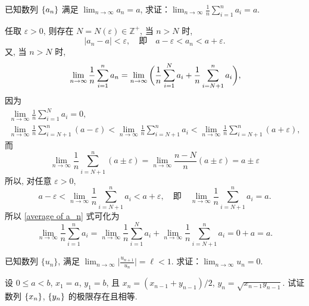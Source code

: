 \begin{exercise}
    已知数列 $\set{a_n}$ 满足 $\displaystyle \lim_{n \to \infty}a_n=a$, 求证：$\displaystyle \lim_{n \to \infty} \frac 1n \sum_{i=1}^{n}a_i=a$.
\end{exercise}

\begin{proofs}
    任取 $\varepsilon>0$, 则存在 $N=N(\varepsilon) \in \mathbb{Z}^+$, 当 $n>N$ 时, 
    \[ \lvert a_n-a \rvert  < \varepsilon,\quad\text{即}\quad a-\varepsilon<a_n<a+\varepsilon. \]
    又, 当 $n>N$ 时, 
    \begin{equation}{\label{average of a_n}}
    \lim_{n \to \infty} \frac 1n \sum_{i=1}^{n}a_n=\lim_{n \to \infty} \bigg(
    \frac 1n \sum_{i=1}^{N}a_i + \frac 1n \sum_{i=N+1}^{n}a_i 
    \bigg),
    \end{equation}
    因为
    \begin{gather*}
    \lim_{n \to \infty} \frac 1n \sum_{i=1}^{N}a_i = 0, \\
    \lim_{n \to \infty} \frac 1n \sum_{i=N+1}^{n} (a-\varepsilon) < 
    \lim_{n \to \infty} \frac 1n \sum_{i=N+1}^{n} a_i <
    \lim_{n \to \infty} \frac 1n \sum_{i=N+1}^{n} (a+\varepsilon),
    \end{gather*}
    而
    \[
    \lim_{n \to \infty} \frac 1n \sum_{i=N+1}^{n} (a\pm\varepsilon) =
    \lim_{n \to \infty} \frac{n-N}{n} (a\pm\varepsilon) =
    a\pm\varepsilon
    \]
    所以, 对任意 $\varepsilon>0$, 
    \[
    a-\varepsilon < \lim_{n \to \infty} \frac 1n \sum_{i=N+1}^{n} a_i < a+\varepsilon,
    \quad\text{即}\quad \lim_{n \to \infty} \frac 1n \sum_{i=N+1}^{n} a_i = a.
    \]
    所以 \eqref{average of a_n} 式可化为
    \[
    \lim_{n \to \infty} \frac 1n \sum_{i=1}^{n} a_i =
    \lim_{n \to \infty} \frac 1n \sum_{i=1}^{N} a_i +
    \lim_{n \to \infty} \frac 1n \sum_{i=N+1}^{n} a_i =
    0 + a = a. \tag*{$\qed$}
    \]
\end{proofs}

\begin{exercise}
    已知数列 $\{u_n\}$, 满足 $\displaystyle \lim_{n \to \infty}\Big\lvert\frac{u_{n+1}}{u_n}\Big\rvert=\ell<1$. 求证：$\displaystyle \lim_{n \to \infty}u_n=0$.
\end{exercise}

\begin{exercise}[算术-几何平均数]
    设 $0 \le a < b$, $x_1 = a$, $y_1 = b$, 且 $x_n = (x_{n - 1} + y_{n - 1}) / 2$, $y_n = \sqrt{x_{n-1} y_{n - 1}}$. 试证数列 $\set{x_n}$, $\set{y_n}$ 的极限存在且相等.
\end{exercise}

